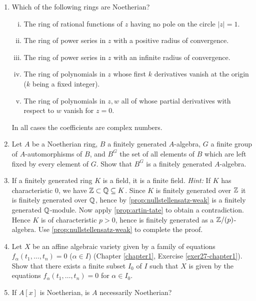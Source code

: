 \begin{enumerate}
    \item \label{exer4-chapter7}Which of the following rings are Noetherian?
    \begin{enumerate}[i)]
        \item The ring of rational functions of $z$ having no pole on the circle $|z| = 1$.
        \item The ring of power series in $z$ with a positive radius of convergence.
        \item The ring of power series in $z$ with an infinite radius of convergence.
        \item The ring of polynomials in $z$ whose first $k$ derivatives vanish at the origin ($k$ being a fixed integer).
        \item The ring of polynomials in $z, w$ all of whose partial derivatives with respect to $w$ vanish for $z = 0$.
    \end{enumerate}
    In all cases the coefficients are complex numbers.

    \item \label{exer5-chapter7}Let $A$ be a Noetherian ring, $B$ a finitely generated $A$-algebra, $G$ a finite group of $A$-automorphisms of $B$, and $B^G$ the set of all elements of $B$ which are left fixed by every element of $G$. Show that $B^G$ is a finitely generated $A$-algebra.

    \item \label{exer6-chapter7}If a finitely generated ring $K$ is a field, it is a finite field.
    \textit{Hint:} If $K$ has characteristic 0, we have $\mathbb{Z} \subset \mathbb{Q} \subseteq K$. Since $K$ is finitely generated over $\mathbb{Z}$ it is finitely generated over $\mathbb{Q}$, hence by \eqref{prop:nullstellensatz-weak} is a finitely generated $\mathbb{Q}$-module. Now apply \eqref{prop:artin-tate} to obtain a contradiction. Hence $K$ is of characteristic $p > 0$, hence is finitely generated as a $\mathbb{Z}/(p)$-algebra. Use \eqref{prop:nullstellensatz-weak} to complete the proof.

    \item \label{exer7-chapter7}Let $X$ be an affine algebraic variety given by a family of equations $f_\alpha(t_1, \ldots, t_n) = 0$ ($\alpha \in I$) (Chapter \ref{chapter1}, Exercise \ref{exer27-chapter1}). Show that there exists a finite subset $I_0$ of $I$ such that $X$ is given by the equations $f_\alpha(t_1, \ldots, t_n) = 0$ for $\alpha \in I_0$.

    \item \label{exer8-chapter7}If $A[x]$ is Noetherian, is $A$ necessarily Noetherian?


\end{enumerate}

